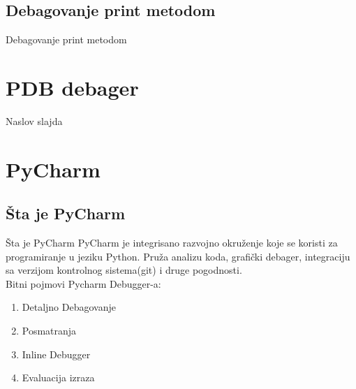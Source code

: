 \documentclass{beamer}
\begin{document}
\subsection{Debagovanje print metodom}
\begin{frame}{Debagovanje print metodom}
    
\end{frame}


\section{PDB debager}
\begin{frame}{Naslov slajda}
    
\end{frame}

\section{PyCharm}
\subsection{Šta je PyCharm}
\begin{frame}{Šta je PyCharm}
PyCharm je integrisano razvojno okruženje koje se koristi za programiranje u jeziku Python. Pruža analizu koda, grafički debager, integraciju sa verzijom kontrolnog sistema(git) i druge pogodnosti.\\
Bitni pojmovi Pycharm Debugger-a:
\begin{enumerate}
    \item Detaljno Debagovanje
    \item Posmatranja
    \item Inline Debugger
    \item Evaluacija izraza
\end{enumerate}
\end{frame}
\end{document}
